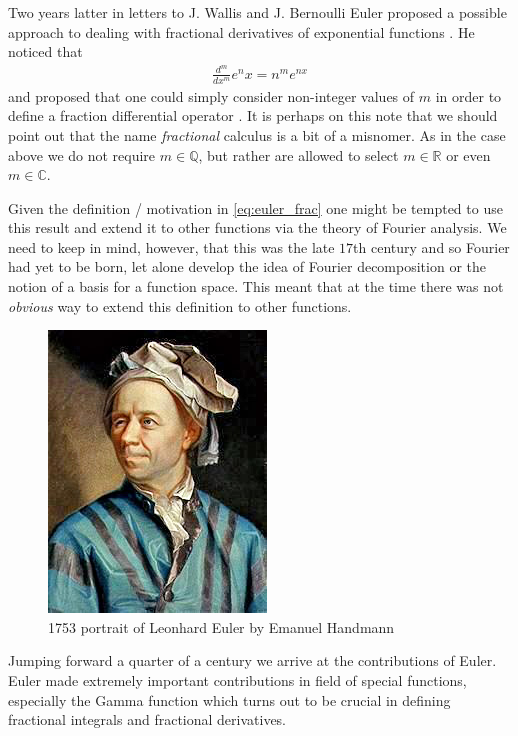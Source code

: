 Two years latter in letters to J. Wallis and J. Bernoulli Euler proposed a possible approach to dealing with fractional derivatives of exponential functions \cite{Abbas2012}. He noticed that
\begin{align}
    \label{eq:euler_frac}
    \frac{d^m}{dx^m} e^nx = n^me^{nx} 
\end{align}
and proposed that one could simply consider non-integer values of $ m $ in order to define a fraction differential operator \cite{Samko1993}.
It is perhaps on this note that we should point out that the name \emph{fractional} calculus is a bit of a misnomer. As in the case above we do not require $ m \in \mathbb{Q} $, but rather are allowed to select $ m \in \mathbb{R} $ or even $ m \in \mathbb{C} $.

Given the definition / motivation in \eqref{eq:euler_frac} one might be tempted to use this result and extend it to other functions via the theory of Fourier analysis. We need to keep in mind, however, that this was the late $ 17$th century and so Fourier had yet to be born, let alone develop the idea of Fourier decomposition or the notion of a basis for a function space. This meant that at the time there was not \emph{obvious} way to extend this definition to other functions.

\begin{figure}
    \includegraphics[scale=0.8]{images/Leonhard_Euler}
    \caption{1753 portrait of Leonhard Euler by Emanuel Handmann}
\end{figure}

Jumping forward a quarter of a century we arrive at the contributions of Euler. Euler made extremely important contributions in field of special functions, especially the Gamma function which turns out to be crucial in defining fractional integrals and fractional derivatives.

